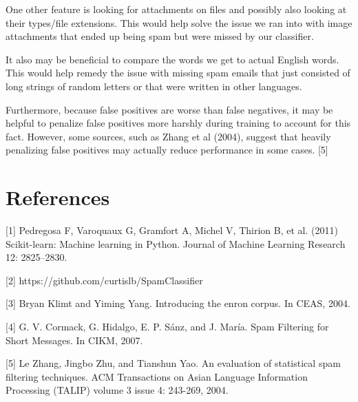\documentclass{article} %
\begin{document}
One other feature is looking for attachments on files and possibly also looking at their types/file extensions. This would help solve the issue we ran into with image attachments that ended up being spam but were missed by our classifier. 

It also may be beneficial to compare the words we get to actual English words. This would help remedy the issue with missing spam emails that just consisted of long strings of random letters or that were written in other languages. 

Furthermore, because false positives are worse than false negatives, it may be helpful to penalize false positives more harshly during training to account for this fact. However, some sources, such as Zhang et al (2004), suggest that heavily penalizing false positives may actually reduce performance in some cases. [5]

\section{References}

[1] Pedregosa F, Varoquaux G, Gramfort A, Michel V, Thirion B, et al. (2011) Scikit-learn: Machine learning in Python. Journal of Machine Learning Research 12: 2825–2830.

[2] https://github.com/curtislb/SpamClassifier

[3] Bryan Klimt and Yiming Yang. Introducing the enron corpus. In CEAS, 2004.

[4] G. V. Cormack, G. Hidalgo, E. P. Sánz, and J. María. Spam Filtering for Short Messages. In CIKM, 2007.

[5] Le Zhang, Jingbo Zhu, and Tianshun Yao. An evaluation of statistical spam filtering techniques. ACM Transactions on Asian Language Information Processing (TALIP) volume 3 issue 4: 243-269, 2004.
\end{document}

